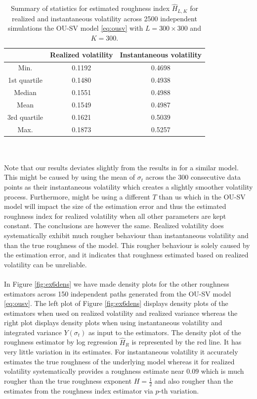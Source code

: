 \documentclass{article}
\begin{document}
\begin{table}[htbp]
    \centering
    \begin{tabular}{ccc}
        \toprule
         & Realized volatility & Instantaneous volatility \\
        \midrule
        Min. & 0.1192 & 0.4698 \\
        1st quartile & 0.1480 & 0.4938 \\
        Median & 0.1551 & 0.4988 \\
        Mean & 0.1549 & 0.4987 \\
        3rd quartile & 0.1621 & 0.5039 \\
        Max. & 0.1873 & 0.5257 \\
        \bottomrule
    \end{tabular}
    \caption{Summary of statistics for estimated roughness index $\hat{H}_{L,K}$ for realized and instantaneous volatility across 2500 independent simulations the OU-SV model \eqref{eq:ousv} with $L=300\times 300$ and $K=300$.}
    \label{tab:ex6dens}
\end{table}\\\\
Note that our results deviates slightly from the results in \cite{cont} for a similar model. This might be caused by \cite{cont} using the mean of $\sigma_t$ across the 300 consecutive data points as their instantaneous volatility which creates a slightly smoother volatility process. Furthermore, \cite{cont} might be using a different $T$ than us which in the OU-SV model will impact the size of the estimation error and thus the estimated roughness index for realized volatility when all other parameters are kept constant. The conclusions are however the same. Realized volatility does systematically exhibit much rougher behaviour than instantaneous volatility and than the true roughness of the model. This rougher behaviour is solely caused by the estimation error, and it indicates that roughness estimated based on realized volatility can be unreliable.\\\\
In Figure \ref{fig:ex6dens} we have made density plots for the other roughness estimators across 150 independent paths generated from the OU-SV model \eqref{eq:ousv}. The left plot of Figure \ref{fig:ex6dens} displays density plots of the estimators when used on realized volatility and realized variance whereas the right plot displays density plots when using instantaneous volatility and integrated variance $Y(\sigma_t)$ as input to the estimators. The density plot of the roughness estimator by log regression $\widehat{H}_R$ is represented by the red line. It has very little variation in its estimates. For instantaneous volatility it accurately estimates the true roughness of the underlying model whereas it for realized volatility systematically provides a roughness estimate near $0.09$ which is much rougher than the true roughness exponent $H=\frac{1}{2}$ and also rougher than the estimates from the roughness index estimator via $p$-th variation.\\
\end{document}

